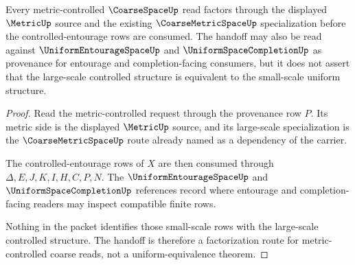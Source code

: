 \begin{theorem}
\label{thm:coarse-space-metric-entourage-handoff}
Every metric-controlled $\CoarseSpaceUp$ read factors through the displayed $\MetricUp$ source and the existing $\CoarseMetricSpaceUp$ specialization before the controlled-entourage rows are consumed. The handoff may also be read against $\UniformEntourageSpaceUp$ and $\UniformSpaceCompletionUp$ as provenance for entourage and completion-facing consumers, but it does not assert that the large-scale controlled structure is equivalent to the small-scale uniform structure.
\end{theorem}
\begin{proof}
Read the metric-controlled request through the provenance row $P$. Its metric side is the displayed $\MetricUp$ source, and its large-scale specialization is the $\CoarseMetricSpaceUp$ route already named as a dependency of the carrier.

The controlled-entourage rows of $X$ are then consumed through $\Delta,E,J,K,I,H,C,P,N$. The $\UniformEntourageSpaceUp$ and $\UniformSpaceCompletionUp$ references record where entourage and completion-facing readers may inspect compatible finite rows.

Nothing in the packet identifies those small-scale rows with the large-scale controlled structure. The handoff is therefore a factorization route for metric-controlled coarse reads, not a uniform-equivalence theorem.
\end{proof}




